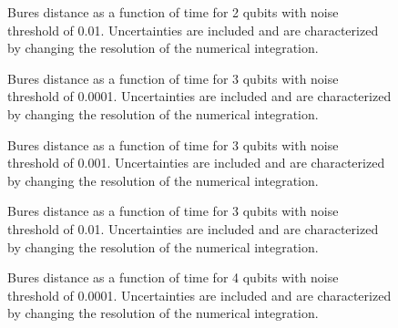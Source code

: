 \pagebreak

\begin{figure}[h]
\begin{center}
\end{center}
\caption{Bures distance as a function of time for 2 qubits with noise
threshold of 0.01.  Uncertainties are included and are characterized 
by changing the resolution of the numerical integration.}
\end{figure}

\pagebreak

\begin{figure}[h]
\begin{center}
\end{center}
\caption{Bures distance as a function of time for 3 qubits with noise
threshold of 0.0001.  Uncertainties are included and are characterized 
by changing the resolution of the numerical integration.}
\end{figure}

\pagebreak

\begin{figure}[h]
\begin{center}
\end{center}
\caption{Bures distance as a function of time for 3 qubits with noise
threshold of 0.001.  Uncertainties are included and are characterized 
by changing the resolution of the numerical integration.}
\end{figure}

\pagebreak

\begin{figure}[h]
\begin{center}
\end{center}
\caption{Bures distance as a function of time for 3 qubits with noise
threshold of 0.01.  Uncertainties are included and are characterized 
by changing the resolution of the numerical integration.}
\end{figure}

\pagebreak

\begin{figure}[h]
\begin{center}
\end{center}
\caption{Bures distance as a function of time for 4 qubits with noise
threshold of 0.0001.  Uncertainties are included and are characterized 
by changing the resolution of the numerical integration.}
\end{figure}

